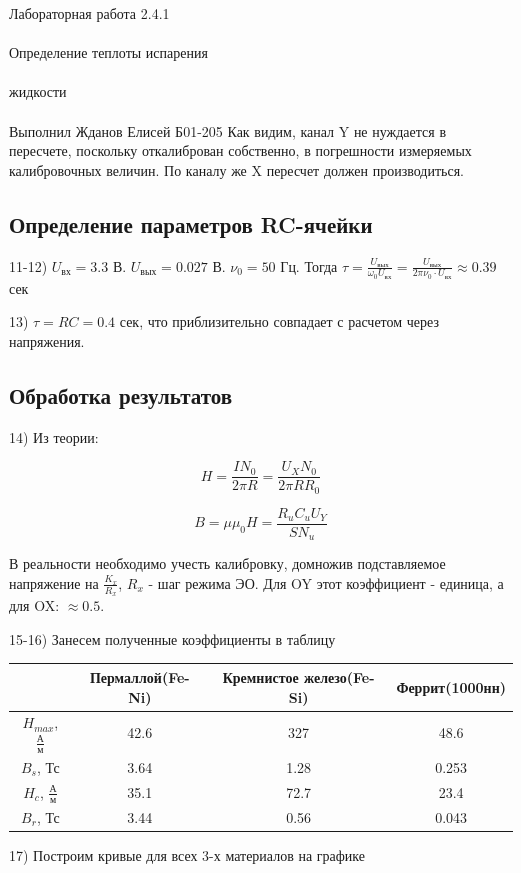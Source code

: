 \documentclass{astroedu-lab}
\begin{document}
\begin{problem}{\huge Лабораторная работа 2.4.1\\\\Определение теплоты испарения\\\\жидкости\\\\Выполнил Жданов Елисей Б01-205}
Как видим, канал Y не нуждается в пересчете, поскольку откалиброван собственно, в погрешности измеряемых калибровочных величин. По каналу же X пересчет должен производиться.

\subsection{Определение параметров RC-ячейки}

11-12) $U_\text{вх} = 3.3$ В. $U_\text{вых} = 0.027$ В. $\nu_0 = 50$ Гц. Тогда $\tau = \frac{U_\text{вых}}{\omega_0 U_\text{вх}} = \frac{U_\text{вых}}{2 \pi \nu_0 \cdot U_\text{вх}} \approx 0.39$ сек

13) $\tau = R C = 0.4$ сек, что приблизительно совпадает с расчетом через напряжения.

\subsection{Обработка результатов}

14) Из теории:

\begin{equation}
	H = \frac{I N_0}{2 \pi R} = \frac{U_X N_0}{2 \pi R R_0}
\end{equation}

\begin{equation}
	B = \mu \mu_0 H = \frac{R_u C_u U_Y}{S N_u}
\end{equation}

В реальности необходимо учесть калибровку, домножив подставляемое напряжение на $\frac{K_x}{R_x}$, $R_x$ - шаг режима ЭО. Для OY этот коэффициент - единица, а для OX: $\approx 0.5$.

15-16) Занесем полученные коэффициенты в таблицу

\begin{center}
\begin{tabular}{|c|c|c|c|}
\hline
& Пермаллой(Fe-Ni) & Кремнистое железо(Fe-Si) & Феррит(1000нн) \\
\hline
$H_{max}$, $\frac{\text{А}}{\text{м}}$ & 42.6 &	327 &	48.6  \\
$B_s$, Тс & 3.64	& 1.28 &	0.253 \\
$H_c$, $\frac{\text{А}}{\text{м}}$ & 35.1&	72.7&	23.4	 \\
$B_r$, Тс & 3.44 &	0.56 &	0.043  \\
\hline
\end{tabular}
\end{center}

17) Построим кривые для всех 3-х материалов на графике


\end{problem}
\end{document}
